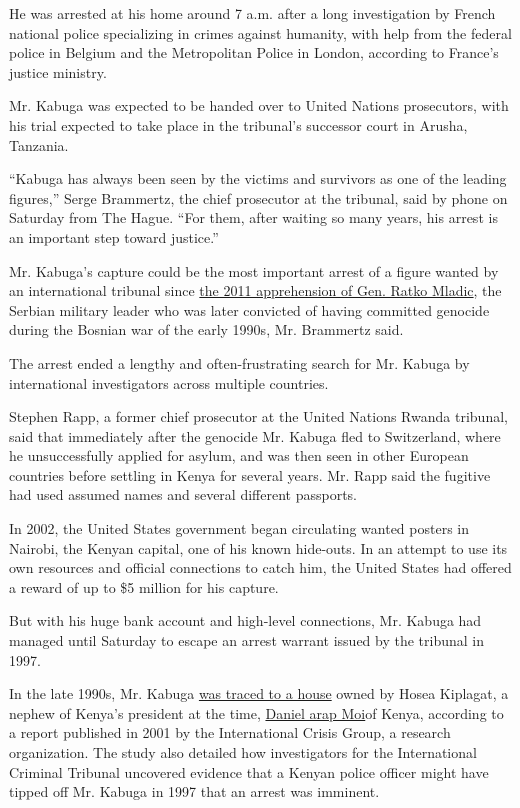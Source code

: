 He was arrested at his home around 7 a.m. after a long investigation by
French national police specializing in crimes against humanity, with
help from the federal police in Belgium and the Metropolitan Police in
London, according to France's justice ministry.

Mr. Kabuga was expected to be handed over to United Nations prosecutors,
with his trial expected to take place in the tribunal's successor court
in Arusha, Tanzania.

``Kabuga has always been seen by the victims and survivors as one of the
leading figures,'' Serge Brammertz, the chief prosecutor at the
tribunal, said by phone on Saturday from The Hague. ``For them, after
waiting so many years, his arrest is an important step toward justice.''

Mr. Kabuga's capture could be the most important arrest of a figure
wanted by an international tribunal since
\href{https://www.nytimes3xbfgragh.onion/2011/05/27/world/europe/27ratko-mladic.html}{the
2011 apprehension of Gen. Ratko Mladic}, the Serbian military leader who
was later convicted of having committed genocide during the Bosnian war
of the early 1990s, Mr. Brammertz said.

The arrest ended a lengthy and often-frustrating search for Mr. Kabuga
by international investigators across multiple countries.

Stephen Rapp, a former chief prosecutor at the United Nations Rwanda
tribunal, said that immediately after the genocide Mr. Kabuga fled to
Switzerland, where he unsuccessfully applied for asylum, and was then
seen in other European countries before settling in Kenya for several
years. Mr. Rapp said the fugitive had used assumed names and several
different passports.

In 2002, the United States government began circulating wanted posters
in Nairobi, the Kenyan capital, one of his known hide-outs. In an
attempt to use its own resources and official connections to catch him,
the United States had offered a reward of up to \$5 million for his
capture.

But with his huge bank account and high-level connections, Mr. Kabuga
had managed until Saturday to escape an arrest warrant issued by the
tribunal in 1997.

In the late 1990s, Mr. Kabuga
\href{https://www.nytimes3xbfgragh.onion/2002/06/13/world/face-of-rwa}{was
traced to a house} owned by Hosea Kiplagat, a nephew of Kenya's
president at the time,
\href{https://www.nytimes3xbfgragh.onion/2020/02/03/obituaries/daniel-arap-moi-dead.html}{Daniel
arap Moi}of Kenya, according to a report published in 2001 by the
International Crisis Group, a research organization. The study also
detailed how investigators for the International Criminal Tribunal
uncovered evidence that a Kenyan police officer might have tipped off
Mr. Kabuga in 1997 that an arrest was imminent.

